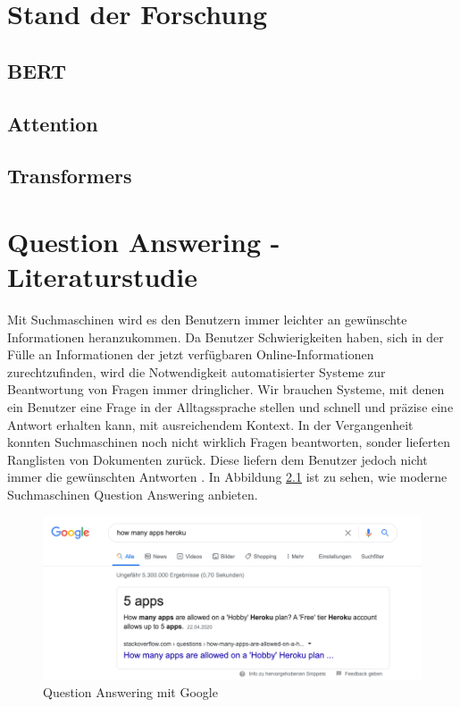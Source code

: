 \documentclass[
        ngerman,
        paper=a4,
        numbers=noendperiod,
]{scrreprt}
\begin{document}


\chapter{Stand der Forschung}
\section{BERT}
\section{Attention}
\section{Transformers}







\chapter{Question Answering - Literaturstudie} 


    
Mit Suchmaschinen wird es den Benutzern immer leichter an gewünschte Informationen heranzukommen. Da Benutzer Schwierigkeiten haben, sich in der Fülle an Informationen der jetzt verfügbaren Online-Informationen zurechtzufinden, wird die Notwendigkeit automatisierter Systeme zur Beantwortung von Fragen immer dringlicher. Wir brauchen Systeme, mit denen ein Benutzer eine Frage in der Alltagssprache stellen und schnell und präzise eine Antwort erhalten kann, mit ausreichendem Kontext. In der Vergangenheit konnten Suchmaschinen noch nicht wirklich Fragen beantworten, sonder lieferten Ranglisten von Dokumenten zurück. Diese liefern dem Benutzer jedoch nicht immer die gewünschten Antworten \citep[S. 275]{Hirschman2001NaturalHere}. In Abbildung \ref{fig:google} ist zu sehen, wie moderne Suchmaschinen Question Answering anbieten.

\begin{figure}[H]
    \centering\includegraphics[width=1\linewidth]{images/google.png}
    \caption[Question Answering mit Google]{Question Answering mit Google}
    \label{fig:google}
\end{figure}
\end{document}
